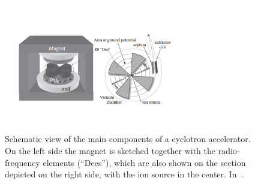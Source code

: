 \begin{figure}[!htbp]
\centering
\includegraphics[width=0.7\textwidth]{03_GraphicFiles/chapter1_Introduction/cyclotron.pdf}
\caption{Schematic view of the main components of a cyclotron accelerator. On the left side the magnet is sketched together with the radio-frequency elements (\enquote{Dees}), which are also shown on the section depicted on the right side, with the ion source in the center. In~\cite{PaganettiBook2012}.}
\label{chap1::fig::cyclotron}
\end{figure} 


